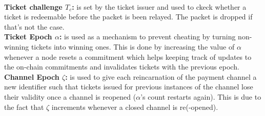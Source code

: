     \\\textbf{Ticket challenge $T_c$:}  is set by the ticket issuer and used to ckeck whether a ticket is redeemable before the packet is been relayed. The packet is dropped if that's not the case.
    \\\textbf{Ticket Epoch $\alpha$:} is used as a mechanism to prevent cheating by turning non-winning tickets into winning ones. This is done by increasing the value of $\alpha$ whenever a node resets a commitment which helps keeping track of updates to the on-chain commitments and invalidates tickets with the previous epoch.
    \\\textbf{Channel Epoch $\zeta$:} is used to give each reincarnation of the payment channel a new identifier such that tickets issued for previous instances of the channel lose their validity once a channel is reopened ($\alpha$'s count restarts again). This is due to the fact that $\zeta$ increments whenever a closed channel is re(-opened).
    \begin{comment}
        
   
    \\\textbf{ChainId $c_{Id}$:} The channel identifier which is defined by the ticket issuer in order to determine which channel will be used between issuer and recipient. For example, tickets that are valid on xDAI are not valid on Ethereum.
    \\\textbf{Tag $\tau$} is given as a constant and depends on the utilized blockchain. It is used to distinguish HOPR tickets from others with the same structure that are meant for different payment channels and invalidates their usage in HOPR.
    \\\textbf{Version $V$} is given as a constant and depends on the utilized blockchain. It is used to invalidate tickets that were issued for previous versions of HOPR from being used in future iterations of the protocol.

\end{comment}

